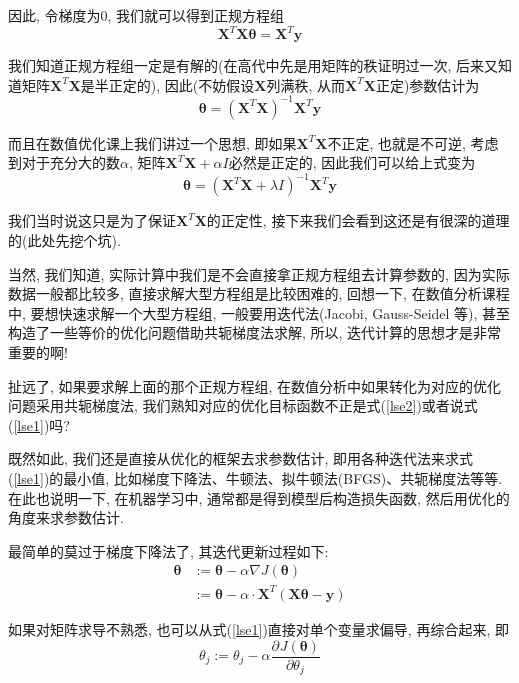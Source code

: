 \documentclass[a4paper,UTF8]{ctexart}
\theoremstyle{plain} \newtheorem{theorem}{定理}[section]
\theoremstyle{plain} \newtheorem{definition}{定义}[section]
\theoremstyle{plain} \newtheorem{lemma}{引理}[section]
\theoremstyle{plain} \newtheorem{proposition}{命题}[section]
\theoremstyle{plain} \newtheorem{example}{例}[section]
\theoremstyle{plain} \newtheorem{remark}{注}[section]
\theoremstyle{plain} \newtheorem{corollary}{推论}[section]
\newcommand{\p}[3]{\frac{\partial^{#1}#2}{\partial{#3}^{#1}}}  %
\begin{document}
因此, 令梯度为$0$, 我们就可以得到正规方程组
\begin{equation*}
\bm{X}^{T} \bm{X} \bm{\theta} = \bm{X}^{T} \bm{y}
\end{equation*}

我们知道正规方程组一定是有解的(在高代中先是用矩阵的秩证明过一次, 后来又知道矩阵$\bm{X}^{T} \bm{X}$是半正定的), 因此(不妨假设$\bm{X}$列满秩, 从而$\bm{X}^{T} \bm{X}$正定)参数估计为
\begin{equation*}
\bm{\theta} = (\bm{X}^{T} \bm{X})^{-1} \bm{X}^{T} \bm{y}
\end{equation*}

而且在数值优化课上我们讲过一个思想, 即如果$\bm{X}^{T} \bm{X}$不正定, 也就是不可逆, 考虑到对于充分大的数$\alpha$, 矩阵$\bm{X}^{T} \bm{X} + \alpha I$必然是正定的, 因此我们可以给上式变为
\begin{equation*}
\bm{\theta} = (\bm{X}^{T} \bm{X} + \lambda I)^{-1} \bm{X}^{T} \bm{y}
\end{equation*}

我们当时说这只是为了保证$\bm{X}^{T} \bm{X}$的正定性, 接下来我们会看到这还是有很深的道理的(此处先挖个坑).

当然, 我们知道, 实际计算中我们是不会直接拿正规方程组去计算参数的, 因为实际数据一般都比较多, 直接求解大型方程组是比较困难的, 回想一下, 在数值分析课程中, 要想快速求解一个大型方程组, 一般要用迭代法(Jacobi, Gauss-Seidel 等), 甚至构造了一些等价的优化问题借助共轭梯度法求解, 所以, 迭代计算的思想才是非常重要的啊! 

扯远了, 如果要求解上面的那个正规方程组, 在数值分析中如果转化为对应的优化问题采用共轭梯度法, 我们熟知对应的优化目标函数不正是式(\ref{lse2})或者说式(\ref{lse1})吗?

既然如此, 我们还是直接从优化的框架去求参数估计, 即用各种迭代法来求式(\ref{lse1})的最小值, 比如梯度下降法、牛顿法、拟牛顿法(BFGS)、共轭梯度法等等. 在此也说明一下, 在机器学习中, 通常都是得到模型后构造损失函数, 然后用优化的角度来求参数估计.

最简单的莫过于梯度下降法了, 其迭代更新过程如下:
\begin{align*}
\bm{\theta} & := \bm{\theta} - \alpha \nabla J(\bm{\theta}) \\ 
& := \bm{\theta} - \alpha \cdot \bm{X}^{T} (\bm{X} \bm{\theta} - \bm{y})
\end{align*}

如果对矩阵求导不熟悉, 也可以从式(\ref{lse1})直接对单个变量求偏导, 再综合起来, 即
\begin{equation*}
\theta_j := \theta_j - \alpha \p{}{J(\bm{\theta})}{\theta_j}
\end{equation*}
\end{document}
